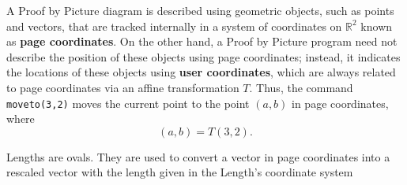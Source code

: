 \documentclass[12pt]{article}
\def\prg#1{{\tt #1}}
\def\pbp{Proof by Picture }
\begin{document}
A \pbp diagram is described using geometric objects, such
as points and vectors, that are tracked
internally in a system of coordinates on $\mathbb{R}^2$ known 
as {\bf page coordinates}.  On the other hand, 
a \pbp program need not describe the position of these
objects using page coordinates; instead, it indicates
the locations of these objects using {\bf user coordinates},
which are always related to page coordinates via an affine
transformation $T$.  Thus, the command \prg{moveto(3,2)}
moves the current point to the point $(a,b)$ in page
coordinates, where
$$
(a,b) = T(3,2).
$$


Lengths are ovals.  They are used to convert a vector in page
coordinates into a rescaled vector with the length given in the Length's
coordinate system
\end{document}
